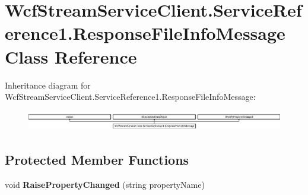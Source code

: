 \hypertarget{class_wcf_stream_service_client_1_1_service_reference1_1_1_response_file_info_message}{}\section{Wcf\+Stream\+Service\+Client.\+Service\+Reference1.\+Response\+File\+Info\+Message Class Reference}
\label{class_wcf_stream_service_client_1_1_service_reference1_1_1_response_file_info_message}
Inheritance diagram for Wcf\+Stream\+Service\+Client.\+Service\+Reference1.\+Response\+File\+Info\+Message\+:\begin{figure}[H]
\begin{center}
\leavevmode
\includegraphics[height=0.882585cm]{class_wcf_stream_service_client_1_1_service_reference1_1_1_response_file_info_message}
\end{center}
\end{figure}
\subsection*{Protected Member Functions}
\begin{DoxyCompactItemize}
\item 
\mbox{\label{class_wcf_stream_service_client_1_1_service_reference1_1_1_response_file_info_message_a1c9ab3068e198cfe16df97f167c06d3e}} 
void {\bfseries Raise\+Property\+Changed} (string property\+Name)
\end{DoxyCompactItemize}
